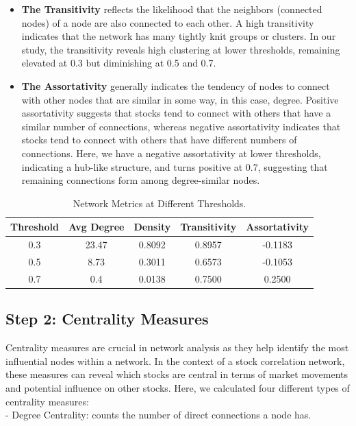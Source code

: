 \documentclass[12pt]{article}
\begin{document}
\begin{itemize}
    \item \textbf{The Transitivity} reflects the likelihood that the neighbors (connected nodes) of a node are also connected to each other. A high transitivity indicates that the network has many tightly knit groups or clusters. In our study, the transitivity reveals high clustering at lower thresholds, remaining elevated at 0.3 but diminishing at 0.5 and 0.7.
    \item \textbf{The Assortativity} generally indicates the tendency of nodes to connect with other nodes that are similar in some way, in this case, degree. Positive assortativity suggests that stocks tend to connect with others that have a similar number of connections, whereas negative assortativity indicates that stocks tend to connect with others that have different numbers of connections. Here, we have a negative assortativity at lower thresholds, indicating a hub-like structure, and turns positive at 0.7, suggesting that remaining connections form among degree-similar nodes.
\end{itemize}

\begin{table}[H]
    \centering
    \begin{tabular}{|c|c|c|c|c|}
        \hline
        Threshold & Avg Degree & Density & Transitivity & Assortativity \\
        \hline
        0.3 & 23.47 & 0.8092 & 0.8957 & -0.1183 \\
        0.5 & 8.73 & 0.3011 & 0.6573 & -0.1053 \\
        0.7 & 0.4 & 0.0138 & 0.7500 & 0.2500 \\
        \hline
    \end{tabular}
    \caption{Network Metrics at Different Thresholds.}
\end{table}

\subsection{Step 2: Centrality Measures}
Centrality measures are crucial in network analysis as they help identify the most influential nodes within a network. In the context of a stock correlation network, these measures can reveal which stocks are central in terms of market movements and potential influence on other stocks. Here, we calculated four different types of centrality measures:\\

- Degree Centrality: counts the number of direct connections a node has. 
\end{document}
